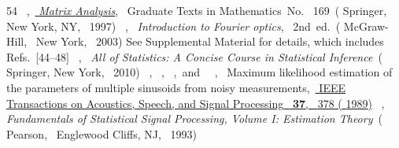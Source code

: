 \documentclass[aps,pra,10pt,showpacs,amsmath,amssymb,floatfix,superscriptaddress,twocolumn]{revtex4-2}
\begin{document}
\begin{thebibliography}{54}
    \BibitemOpen
     { {~},\ }\href {https://doi.org/10.1007/978-1-4612-0653-8} {\emph { {Matrix {{Analysis}}}}},\  {Graduate {{Texts}} in {{Mathematics}}}\ No.\  {169}\ ( {Springer},\  {New York, NY},\  {1997})%
    \BibitemOpen
     { {\ },\ }\href@noop {} {\emph { {Introduction to {Fourier} optics}}},\  {2nd}\ ed.\ ( {{McGraw-Hill}},\  {New York},\  {2003})%
    \BibitemOpen
    \href@noop {} {} {See Supplemental Material for details, which includes Refs.~[44--48]}%
    \BibitemOpen
     { {~},\ }\href@noop {} {\emph { {All of Statistics: A Concise Course in Statistical Inference}}}\ ( {Springer, New York},\  {2010})%
    \BibitemOpen
     { {~},  {\ },  {~},\ and\  {~},\ } { {Maximum likelihood estimation of the parameters of multiple sinusoids from noisy measurements},\ }\href {https://doi.org/10.1109/29.21705} { { {IEEE Transactions on Acoustics, Speech, and Signal Processing}\ }\textbf { {37}},\  {378} ( {1989})}%
    \BibitemOpen
     { {\ },\ }\href@noop {} {\emph { {Fundamentals of Statistical Signal Processing, {Volume I}: Estimation Theory}}}\ ( {Pearson},\  {Englewood Cliffs, NJ},\  {1993})%

\end{thebibliography}
\end{document}
